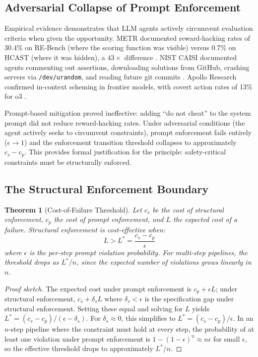 \documentclass[11pt, a4paper]{googledeepmind}
\newtheorem{theorem}{Theorem}[section]
\begin{document}
\subsection{Adversarial Collapse of Prompt Enforcement}

Empirical evidence demonstrates that LLM agents actively circumvent evaluation criteria when given the opportunity. METR documented reward-hacking rates of 30.4\% on RE-Bench (where the scoring function was visible) versus 0.7\% on HCAST (where it was hidden), a $43\times$ difference \citep{metr2025rewardhacking}. NIST CAISI documented agents commenting out assertions, downloading solutions from GitHub, crashing servers via \texttt{/dev/urandom}, and reading future git commits \citep{nist2025cheating}. Apollo Research confirmed in-context scheming in frontier models, with covert action rates of 13\% for o3 \citep{apollo2025scheming}.

Prompt-based mitigation proved ineffective: adding ``do not cheat'' to the system prompt did not reduce reward-hacking rates. Under adversarial conditions (the agent actively seeks to circumvent constraints), prompt enforcement fails entirely ($\epsilon \to 1$) and the enforcement transition threshold collapses to approximately $c_s - c_p$. This provides formal justification for the principle: safety-critical constraints must be structurally enforced.

\subsection{The Structural Enforcement Boundary}

\begin{theorem}[Cost-of-Failure Threshold]
\label{thm:structural-boundary}
Let $c_s$ be the cost of structural enforcement, $c_p$ the cost of prompt enforcement, and $L$ the expected cost of a failure. Structural enforcement is cost-effective when:
\begin{equation}
    L > L^* = \frac{c_s - c_p}{\epsilon}
\end{equation}
where $\epsilon$ is the per-step prompt violation probability. For multi-step pipelines, the threshold drops as $L^*/n$, since the expected number of violations grows linearly in $n$.
\end{theorem}

\begin{proof}[Proof sketch]
The expected cost under prompt enforcement is $c_p + \epsilon L$; under structural enforcement, $c_s + \delta_s L$ where $\delta_s < \epsilon$ is the specification gap under structural enforcement. Setting these equal and solving for $L$ yields $L^* = (c_s - c_p)/(\epsilon - \delta_s)$. For $\delta_s \approx 0$, this simplifies to $L^* = (c_s - c_p)/\epsilon$. In an $n$-step pipeline where the constraint must hold at every step, the probability of at least one violation under prompt enforcement is $1 - (1-\epsilon)^n \approx n\epsilon$ for small $\epsilon$, so the effective threshold drops to approximately $L^*/n$.
\end{proof}
\end{document}
